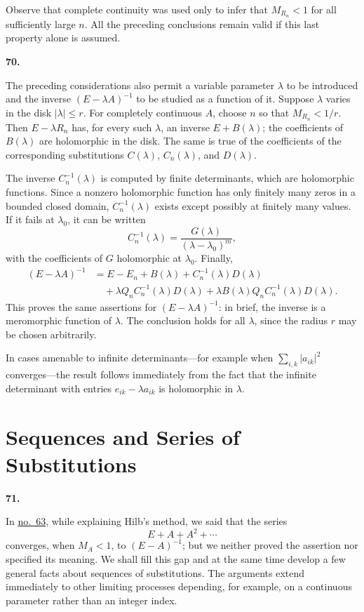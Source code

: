 \documentclass[
  paper=b5,
  fontsize=13pt,
  twoside=true,
  open=any,
  bookmarkpackage=false,
  chapterprefix=true,
  headings=normal
]{scrbook}
\theoremstyle{definition}
\newcommand{\numberedparagraph}[1]{%
  \par\medskip\phantomsection\label{sec:#1}%
  \noindent\textbf{#1.}\enspace
}
\begin{document}
Observe that complete continuity was used only to infer that
$M_{R_n}<1$ for all sufficiently large $n$. All the preceding conclusions
remain valid if this last property alone is assumed.

\numberedparagraph{70}
The preceding considerations also permit a variable parameter $\lambda$ to
be introduced and the inverse $(E-\lambda A)^{-1}$ to be studied as a
function of it. Suppose $\lambda$ varies in the disk $|\lambda|\leq r$.
For completely continuous $A$, choose $n$ so that $M_{R_n}<1/r$. Then
$E-\lambda R_n$ has, for every such $\lambda$, an inverse $E+B(\lambda)$;
the coefficients of $B(\lambda)$ are holomorphic in the disk. The same is
true of the coefficients of the corresponding substitutions
$C(\lambda)$, $C_n(\lambda)$, and $D(\lambda)$.

The inverse $C_n^{-1}(\lambda)$ is computed by finite determinants, which
are holomorphic functions. Since a nonzero holomorphic function has only
finitely many zeros in a bounded closed domain,
$C_n^{-1}(\lambda)$ exists except possibly at finitely many values. If it
fails at $\lambda_0$, it can be written
\[
  C_n^{-1}(\lambda)=\frac{G(\lambda)}{(\lambda-\lambda_0)^m},
\]
with the coefficients of $G$ holomorphic at $\lambda_0$. Finally,
\[
\begin{split}
 (E-\lambda A)^{-1}
 &=E-E_n+B(\lambda)+C_n^{-1}(\lambda)D(\lambda)\\
 &\quad+\lambda Q_nC_n^{-1}(\lambda)D(\lambda)
 +\lambda B(\lambda)Q_nC_n^{-1}(\lambda)D(\lambda).
\end{split}
\]
This proves the same assertions for $(E-\lambda A)^{-1}$: in brief, the
inverse is a meromorphic function of $\lambda$. The conclusion holds for
all $\lambda$, since the radius $r$ may be chosen arbitrarily.

In cases amenable to infinite determinants---for example when
$\sum_{i,k}|a_{ik}|^2$ converges---the result follows immediately from the
fact that the infinite determinant with entries $e_{ik}-\lambda a_{ik}$ is
holomorphic in $\lambda$.

\section{Sequences and Series of Substitutions}
\label{sec:sequences-series-substitutions}

\numberedparagraph{71}
In \hyperref[sec:63]{no.~63}, while explaining Hilb's method, we said that
the series
\[
  E+A+A^2+\cdots
\]
converges, when $M_A<1$, to $(E-A)^{-1}$; but we neither proved the
assertion nor specified its meaning. We shall fill this gap and at the same
time develop a few general facts about sequences of substitutions. The
arguments extend immediately to other limiting processes depending, for
example, on a continuous parameter rather than an integer index.
\end{document}
